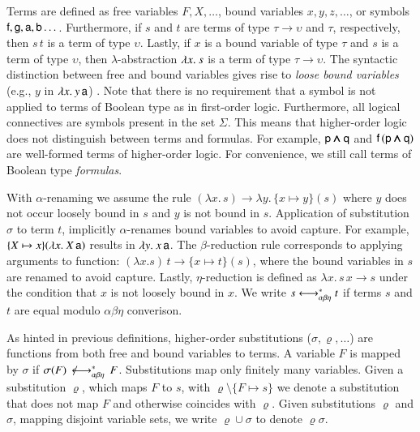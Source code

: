 Terms are defined as free variables $F, X, \ldots$, bound variables $x, y, z,
\dotsc$, or symbols $\mathsf{f}, \mathsf{g},\allowbreak \mathsf{a},\allowbreak \mathsf{b}
\dotsc$. Furthermore, if $s$ and $t$ are terms of type $\tau \rightarrow
\upsilon$ and $\tau$, respectively, then $s \, t$ is a term of type $\upsilon$.
Lastly, if $x$ is a bound variable of type $\tau$ and $s$ is a term of type
$\upsilon$, then $\lambda$-abstraction $\lambda x.\> s$ is a term of type $\tau
\rightarrow \upsilon$. The syntactic distinction between free and bound variables
gives rise to \emph{loose bound variables} (e.g., $y$ in $\lambda x.\> y \, \mathsf{a}$)
\cite{tn-93-patterns}. Note that there is no requirement that a symbol is not
applied to terms of Boolean type as in first-order logic. Furthermore, all
logical connectives are symbols present in the set $\Sigma$. This means that
higher-order logic does not distinguish between terms and formulas. For example,
$\mathsf{p} \pmb\land \mathsf{q}$ and $\mathsf{f} \, (\mathsf{p} \pmb\land \mathsf{q})$ are well-formed
terms of higher-order logic. For convenience, we still call terms of Boolean
type \emph{formulas}.

With $\alpha$-renaming we assume the rule $(\lambda x. \, s) \longrightarrow \lambda
y. \, \{x \mapsto y\}(s)$ where $y$ does not occur loosely bound in $s$ and 
$y$ is not bound in $s$. Application of substitution $\sigma$ to term
$t$, implicitly $\alpha$-renames bound variables to avoid capture.  For example,
$\{X \mapsto x\}(\lambda x.\> X \, \mathsf{a})$ results in $\lambda y.\> x \, \mathsf{a}$. The
$\beta$-reduction rule corresponds to applying arguments to function: $(\lambda
x. s) \, t \longrightarrow \{x \mapsto t\} (s)$, where the bound variables in $s$
are renamed to avoid capture. Lastly, $\eta$-reduction is defined as $\lambda
x.\, s \, x \longrightarrow s$ under the condition that $x$ is not loosely
bound in $x$. We write $s \longleftrightarrow^*_{\alpha\beta\eta} t$ if terms $s$ and $t$ are equal modulo $\alpha\beta\eta$
converison. 

As hinted in previous definitions, higher-order substitutions
($\sigma,\varrho,\ldots$) are functions from both free and bound variables to
terms. A variable $F$ is mapped by $\sigma$ if $ \sigma(F)\,\not\longleftrightarrow^*_{\alpha\beta\eta}\,F$.
Substitutions map only finitely many variables. Given a substitution $\varrho$,
which maps $F$ to $s$, with $\varrho\setminus\{F \mapsto s\}$ we denote a
substitution that does not map $F$ and otherwise coincides with $\varrho$. Given
substitutions $\varrho$ and $\sigma$, mapping disjoint variable sets, we write
$\varrho \cup \sigma$ to denote $\varrho\sigma$.


